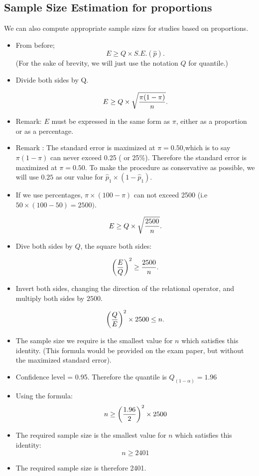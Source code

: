 \subsection{Sample Size Estimation for proportions}
We can also compute appropriate sample sizes for studies based on proportions.
\begin{itemize}
\item From before; \[ E \geq Q \times S.E.(\hat{p}). \]
(For the sake of brevity, we will just use the notation $Q$ for quantile.)

\item Divide both sides by Q.

\[ E \geq Q \times \sqrt{ {\pi(1-\pi)  \over n} }. \]


\item Remark: $E$ must be expressed in the same form as $\pi$, either as a proportion or as a percentage.
\item Remark : The standard error is maximized at $\pi = 0.50$,which is to say $\pi(1-\pi)$ can never exceed 0.25 ( or 25\%). Therefore the standard error is maximized at $\pi = 0.50$. To make the procedure as conservative as possible, we will use $0.25$ as our value for $\hat{p}_1 \times (1 - \hat{p}_1)$.
\item If we use percentages, $\pi \times (100-\pi)$ can not exceed 2500 (i.e $ 50 \times (100-50)=2500)$.

\[ E \geq Q \times \sqrt{{2500 \over n}}. \]




\item Dive both sides by $Q$, the square both sides:

\[ \left({E\over Q}\right)^2 \geq {2500 \over n}. \]

\item Invert both sides, changing the direction of the relational operator, and multiply both sides by $2500$.

\[ \left({Q\over E}\right)^2 \times 2500 \leq n. \]

\item The sample size we require is the smallest value for $n$ which satisfies this identity. (This formula would be provided on the exam paper, but without the maximized standard error).

\item Confidence level = 0.95. Therefore the quantile is $Q_{(1-\alpha)} = 1.96$
\item Using the formula: \[ n \geq \left({1.96 \over 2 }\right)^2 \times 2500  \]
\item The required sample size is the smallest value for $n$ which satisfies this identity: \[ n \geq 2401  \]
\item The required sample size is therefore 2401.
\end{itemize}





